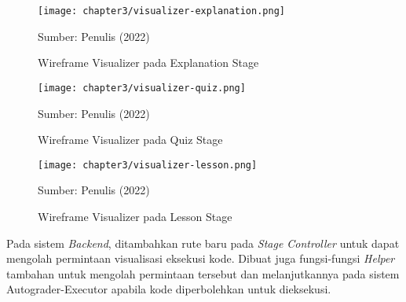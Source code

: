
\begin{figure}[!h]
  \centering
  \texttt{[image: chapter3/visualizer-explanation.png]}
  \caption{Wireframe Visualizer pada Explanation Stage} \label{fig:wireframe-explanation}
  Sumber: Penulis (2022)
\end{figure}

\begin{figure}[!h]
  \centering
  \texttt{[image: chapter3/visualizer-quiz.png]}
  \caption{Wireframe Visualizer pada Quiz Stage} \label{fig:wireframe-quiz}
  Sumber: Penulis (2022)
\end{figure}

\begin{figure}[!h]
  \centering
  \texttt{[image: chapter3/visualizer-lesson.png]}
  \caption{Wireframe Visualizer pada Lesson Stage} \label{fig:wireframe-lesson}
  Sumber: Penulis (2022)
\end{figure}

Pada sistem \textit{Backend}, ditambahkan rute baru pada \textit{Stage Controller} untuk dapat mengolah permintaan visualisasi eksekusi kode. Dibuat juga fungsi-fungsi \textit{Helper} tambahan untuk mengolah permintaan tersebut dan melanjutkannya pada sistem Autograder-Executor apabila kode diperbolehkan untuk dieksekusi.

